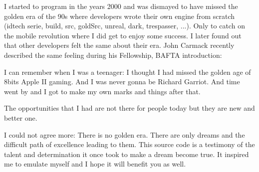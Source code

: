 \documentclass[book.tex]{subfiles}
\begin{document}
I started to program in the years 2000 and was dismayed to have missed the golden era of the 90s where developers wrote their own engine from scratch (idtech serie, build, src, goldSrc, unreal, dark, trespasser, ...). Only to catch on the mobile revolution where I did get to enjoy some success. I later found out that other developers felt the same about their era. John Carmack recently described the same feeling during his Fellowship, BAFTA introduction:

 \begin{fancyquotes}
I can remember when I was a teenager: I thought I had missed the golden age of 8bits Apple II gaming. And I was never gonna be Richard Garriot. And time went by and I got to make
    my own marks and things after that.
    
    The opportunities that I had are not there for people today but they are new and better one.
 \bigskip \\
 \end{fancyquotes}


    
\bigskip
    I could not agree more: There is no golden era. There are only dreams and the difficult path of excellence leading to them. This source code is a testimony of the talent and determination it once took to make a dream become true. It inspired me to emulate myself and I hope it will benefit you as well.

\bigskip


  
\end{document}
